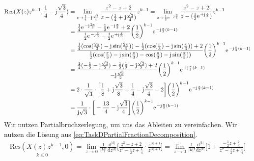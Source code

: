 \begin{align}
	\mathrm{Res}(X(z)z^{k-1},\frac{1}{4}-\im\frac{\sqrt{3}}{4})&=\lim\limits_{z\rightarrow\frac{1}{4}-\im\frac{\sqrt{3}}{4}}\frac{z^2-z+2}{z-(\frac{1}{4}+\im\frac{\sqrt{3}}{4})}z^{k-1}=\lim\limits_{z\rightarrow\frac{1}{2}\e^{-\im\frac{\pi}{3}}}\frac{z^2-z+2}{z-(\frac{1}{2}\e^{+\im\frac{\pi}{3}})}z^{k-1}\nonumber\\
	&=\frac{\frac{1}{4}\e^{-\im\frac{2\pi}{3}}-\frac{1}{2}\e^{-\im\frac{\pi}{3}}+2}{\frac{1}{2}\e^{-\im\frac{\pi}{3}}-\frac{1}{2}\e^{+\im\frac{\pi}{3}}}\bigg(\frac{1}{2}\bigg )^{k-1}\e^{-\im\frac{\pi}{3}(k-1)}\nonumber\\
	&=\frac{\frac{1}{4}(\cos(\frac{2\pi}{3})-\im\sin(\frac{2\pi}{3}))-\frac{1}{2}(\cos(\frac{\pi}{3})-\im\sin(\frac{\pi}{3}))+2}{\frac{1}{2}(\cos(\frac{\pi}{3})-\im\sin(\frac{\pi}{3})-\cos(\frac{\pi}{3})-\im\sin(\frac{\pi}{3}))}\bigg(\frac{1}{2}\bigg )^{k-1}\e^{-\im\frac{\pi}{3}(k-1)}\nonumber\\
	&=\frac{\frac{1}{4}(-\frac{1}{2}-\im\frac{\sqrt{3}}{2})-\frac{1}{2}(\frac{1}{2}-\im\frac{\sqrt{3}}{2})+2}{-\im\frac{\sqrt{3}}{2}}\bigg(\frac{1}{2}\bigg )^{k-1}\e^{+\im\frac{\pi}{3}(k-1)}\nonumber\\
	&=2\cdot\frac{1}{\sqrt{3}}\cdot\bigg [\frac{1}{8}+\im\frac{\sqrt{3}}{8}+\frac{1}{4}-\im\frac{\sqrt{3}}{4}-2\bigg]\bigg(\frac{1}{2}\bigg )^{k-1}\e^{-\im\frac{\pi}{3}(k-1)}\nonumber\\
	&=\frac{1}{\im\sqrt{3}}\cdot\bigg [-\frac{13}{4}-\im\frac{\sqrt{3}}{4}\bigg]\bigg(\frac{1}{2}\bigg)^{k-1}\e^{-\im\frac{\pi}{3}(k-1)}
\end{align}
Wir nutzen Partialbruchzerlegung, um uns das Ableiten zu vereinfachen. Wir nutzen die Lösung aus \ref{eq:TaskDPartialFractionDecomposition}.
\begin{align}
	\underset{k\leq0}{\mathrm{Res}(X(z)z^{k-1},0)}=\lim\limits_{z\rightarrow0}\frac{1}{|k|!}\frac{\mathrm{d}^{|k|}}{\mathrm{d}z^{|k|}} \Bigg [ \frac{z^2-z+2}{z^2-\frac{1}{2}z+\frac{1}{4}}\cdot\frac{z^{|k|+1}}{z^{|k|+1}}\Bigg ]=\lim\limits_{z\rightarrow0}\frac{1}{|k|!}\frac{\mathrm{d}^{|k|}}{\mathrm{d}z^{|k|}}\Bigg [1+\frac{-\frac{1}{2}z+\frac{7}{4}}{z^2-\frac{1}{2}z+\frac{1}{4}} \Bigg]\nonumber\\
\end{align}
